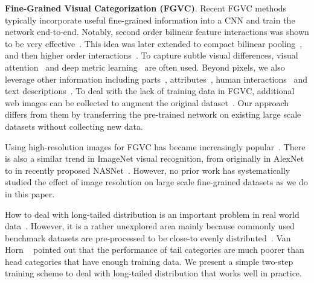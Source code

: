 \documentclass[10pt,twocolumn,letterpaper]{article}
\begin{document}
\textbf{Fine-Grained Visual Categorization (FGVC)}.
Recent FGVC methods typically incorporate useful fine-grained information into a CNN and train the network end-to-end.
Notably, second order bilinear feature interactions was shown to be very effective~\cite{bilinearcnn}.
This idea was later extended to compact bilinear pooling~\cite{cbp}, and then higher order interactions~\cite{kernel_pooling, cai2017higher-order, simon2017generalized}.
To capture subtle visual differences, visual attention~\cite{two-level_attention, fu2017look, multi-attention_fgvc} and deep metric learning~\cite{facenet, cui2016fine} are often used.
Beyond pixels, we also leverage other information including parts~\cite{zhang2014part, pose_normlized_net, zhang2015fine}, attributes~\cite{fine-grained_attributes, gebru2017fine}, human interactions~\cite{branson2010visual, deng2016leveraging} and text descriptions~\cite{fine-grained_description, he2017fine}.
To deal with the lack of training data in FGVC, additional web images can be collected to augment the original dataset~\cite{cui2016fine, krause2016unreasonable, xu2016webly, gebru2017fine}.
Our approach differs from them by transferring the pre-trained network on existing large scale datasets without collecting new data.

Using high-resolution images for FGVC has became increasingly popular~\cite{STN,bilinearcnn}.
There is also a similar trend in ImageNet visual recognition, from originally  in AlexNet~\cite{alexnet} to  in recently proposed NASNet~\cite{nasnet}.
However, no prior work has systematically studied the effect of image resolution on large scale fine-grained datasets as we do in this paper.

How to deal with long-tailed distribution is an important problem in real world data~\cite{long-tail_object, van2017devil}.
However, it is a rather unexplored area mainly because commonly used benchmark datasets are pre-processed to be close-to evenly distributed~\cite{imagenet, coco}.
Van Horn \etal~\cite{van2017devil} pointed out that the performance of tail categories are much poorer than head categories that have enough training data.
We present a simple two-step training scheme to deal with long-tailed distribution that works well in practice.
\end{document}
